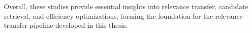 \\\\
Overall, these studies provide essential insights into relevance transfer, candidate retrieval, and efficiency optimizations, forming the foundation for the relevance transfer pipeline developed in this thesis.

